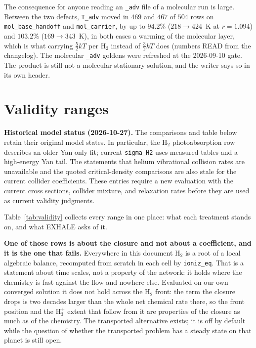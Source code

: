 \documentclass[english,a4paper]{my_memo}
\begin{document}
The consequence for anyone reading an \texttt{\_adv} file of a molecular run
is large. Between the two defects, \texttt{T\_adv} moved in $469$ and $467$ of
$504$ rows on \texttt{mol\_base\_handoff} and \texttt{mol\_carrier}, by up to
$94.2\%$ ($218 \rightarrow 424$~K at $r = 1.094$) and $103.2\%$
($169 \rightarrow 343$~K), in both cases a warming of the molecular layer,
which is what carrying $\tfrac52 kT$ per H$_2$ instead of $\tfrac32 kT$ does
(numbers READ from the changelog). The
molecular \texttt{\_adv} goldens were refreshed at the 2026-09-10 gate. The
product is still not a molecular stationary solution, and the writer says so
in its own header.

\section{Validity ranges}

\noindent\textbf{Historical model status (2026-10-27).}
The comparisons and table below retain their original model states. In
particular, the H$_2$ photoabsorption row describes an older Yan-only fit;
current \texttt{sigma\_H2} uses measured tables and a high-energy Yan tail.
The statements that helium vibrational collision rates are unavailable and
the quoted critical-density comparisons are also stale for the current
collider coefficients. These entries require a new evaluation with the
current cross sections, collider mixture, and relaxation rates before they
are used as current validity judgments.

\label{sec:validity}

Table~\ref{tab:validity} collects every range in one place: what each
treatment stands on, and what EXHALE asks of it.

\textbf{One of those rows is about the closure and not about a coefficient,
and it is the one that fails.} Everywhere in this document H$_2$ is a root of a
local algebraic balance, recomputed from scratch in each cell by
\texttt{ioniz\_eq}. That is a statement about time scales, not a property of
the network: it holds where the chemistry is fast against the flow and nowhere
else. Evaluated on our own converged solution it does not hold across the
H$_2$ front: the term the closure drops is two decades larger than the whole
net chemical rate there, so the front position and the H$_3^+$ extent that follow from
it are properties of the closure as much as of the chemistry. The transported
alternative exists; it is off by default while the question of whether the
transported problem has a steady state on that planet is still open.
\end{document}
